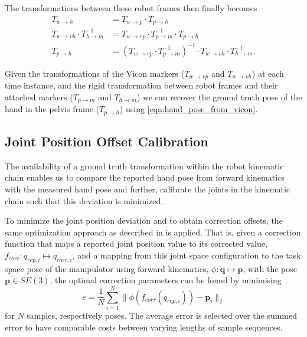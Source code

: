 The transformations between these robot frames then finally becomes
\begin{align}
T_{w \rightarrow h} &= T_{w \rightarrow p} \cdot T_{p \rightarrow h} \\
T_{w \rightarrow vh} \cdot T_{h \rightarrow m}^{-1} &= T_{w \rightarrow vp} \cdot T_{p \rightarrow m}^{-1} \cdot T_{p \rightarrow h} \nonumber \\
T_{p \rightarrow h} &= \left( T_{w \rightarrow vp} \cdot T_{p \rightarrow m}^{-1} \right)^{-1} \cdot T_{w \rightarrow vh} \cdot T_{h \rightarrow m}^{-1} \label{eqn:hand_pose_from_vicon} .
\end{align}

Given the transformations of the Vicon markers ($T_{w \rightarrow vp}$ and $T_{w \rightarrow vh}$) at each time instance, and the rigid transformation between robot frames and their attached markers ($T_{p \rightarrow m}$ and $T_{h \rightarrow m}$) we can recover the ground truth pose of the hand in the pelvis frame ($T_{p \rightarrow h}$) using \cref{eqn:hand_pose_from_vicon}.


\subsection{Joint Position Offset Calibration}

The availability of a ground truth transformation within the robot kinematic chain enables us to compare the reported hand pose from forward kinematics with the measured hand pose and further, calibrate the joints in the kinematic chain such that this deviation is minimized.

To minimize the joint position deviation and to obtain correction offsets, the same optimization approach as described in \cite{Fallon2015} is applied. That is, given a correction function that maps a reported joint position value to its corrected value, $f_{corr}: q_{rep,i} \mapsto q_{corr,i}$, and a mapping from this joint space configuration to the 	task space pose of the manipulator using forward kinematics, $\phi: \mathbf{q} \mapsto \mathbf{p}$, with the pose $\mathbf{p} \in SE(3)$, the optimal correction parameters can be found by minimising
\begin{equation}
e = \frac{1}{N} \sum_{i=1}^N  \lVert \phi \left( f_{corr}(q_{rep,i}) \right) - \mathbf{p}_i \rVert_2
\end{equation}
for $N$ samples, respectively poses. The average error is selected over the summed error to have comparable costs between varying lengths of sample sequences.

